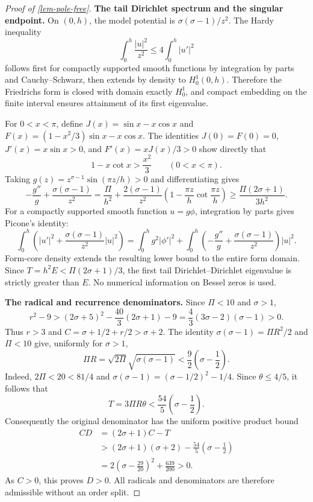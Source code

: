 \documentclass[11pt,a4paper]{article}
\theoremstyle{proofmanuscript}
\begin{document}
\begin{proof}[Proof of \ref{lem-pole-free}]
\textbf{The tail Dirichlet spectrum and the singular endpoint.} On \((0,h)\), the model potential is \(\sigma(\sigma-1)/z^2\). The Hardy inequality \[
\int_0^h\frac{|u|^2}{z^2}\le4\int_0^h|u'|^2
\] follows first for compactly supported smooth functions by integration by parts and Cauchy--Schwarz, then extends by density to \(H_0^1(0,h)\). Therefore the Friedrichs form is closed with domain exactly \(H_0^1\), and compact embedding on the finite interval ensures attainment of its first eigenvalue.

For \(0<x<\pi\), define \(J(x)=\sin x-x\cos x\) and \(F(x)=(1-x^2/3)\sin x-x\cos x\). The identities \(J(0)=F(0)=0\), \(J'(x)=x\sin x>0\), and \(F'(x)=xJ(x)/3>0\) show directly that \[
1-x\cot x>\frac{x^2}{3}\qquad(0<x<\pi).
\] Taking \(g(z)=z^{\sigma-1}\sin(\pi z/h)>0\) and differentiating gives \[
-\frac{g''}{g}+\frac{\sigma(\sigma-1)}{z^2}
=\frac{\Pi}{h^2}+\frac{2(\sigma-1)}{z^2}
\left(1-\frac{\pi z}{h}\cot\frac{\pi z}{h}\right)
\ge\frac{\Pi(2\sigma+1)}{3h^2}.
\] For a compactly supported smooth function \(u=g\phi\), integration by parts gives Picone's identity: \[
\int_0^h\left(|u'|^2+\frac{\sigma(\sigma-1)}{z^2}|u|^2\right)
=\int_0^h g^2|\phi'|^2+
\int_0^h\left(-\frac{g''}{g}+\frac{\sigma(\sigma-1)}{z^2}\right)|u|^2.
\] Form-core density extends the resulting lower bound to the entire form domain. Since \(T=h^2E<\Pi(2\sigma+1)/3\), the first tail Dirichlet--Dirichlet eigenvalue is strictly greater than \(E\). No numerical information on Bessel zeros is used.

\textbf{The radical and recurrence denominators.} Since \(\Pi<10\) and \(\sigma>1\), \[
r^2-9>(2\sigma+5)^2-\frac{40}{3}(2\sigma+1)-9
=\frac43(3\sigma-2)(\sigma-1)>0.
\] Thus \(r>3\) and \(C=\sigma+1/2+r/2>\sigma+2\). The identity \(\sigma(\sigma-1)=\Pi R^2/2\) and \(\Pi<10\) give, uniformly for \(\sigma>1\), \[
\Pi R=\sqrt{2\Pi}\sqrt{\sigma(\sigma-1)}
<\frac92\left(\sigma-\frac12\right).
\] Indeed, \(2\Pi<20<81/4\) and \(\sigma(\sigma-1)=(\sigma-1/2)^2-1/4\). Since \(\theta\le4/5\), it follows that \[
T=3\Pi R\theta<\frac{54}{5}\left(\sigma-\frac12\right).
\] Consequently the original denominator has the uniform positive product bound \[
\begin{aligned}
CD&=(2\sigma+1)C-T\\
&>(2\sigma+1)(\sigma+2)-\frac{54}{5}\left(\sigma-\frac12\right)\\
&=2\left(\sigma-\frac{29}{20}\right)^2+\frac{639}{200}>0.
\end{aligned}
\] As \(C>0\), this proves \(D>0\). All radicals and denominators are therefore admissible without an order split.

\end{proof}
\end{document}

